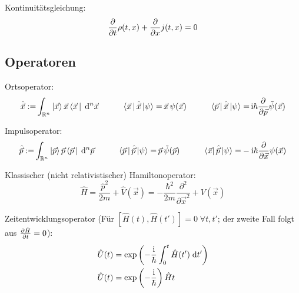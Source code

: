 \documentclass[11pt]{article}
\DeclareMathOperator*{\SumInt}{%
\mathchoice%
  {\ooalign{$\displaystyle\sum$\cr\hidewidth$\displaystyle\int$\hidewidth\cr}}
  {\ooalign{\raisebox{.14\height}{\scalebox{.7}{$\textstyle\sum$}}\cr\hidewidth$\textstyle\int$\hidewidth\cr}}
  {\ooalign{\raisebox{.2\height}{\scalebox{.6}{$\scriptstyle\sum$}}\cr$\scriptstyle\int$\cr}}
  {\ooalign{\raisebox{.2\height}{\scalebox{.6}{$\scriptstyle\sum$}}\cr$\scriptstyle\int$\cr}}
}
\numberwithin{equation}{section}
\begin{document}
				\noindent
				Kontinuitätsgleichung:
				\begin{equation}
					\frac{\partial }{\partial t}\rho(t,x) + \frac{\partial }{\partial x}j(t,x) = 0
				\end{equation}

		\subsection{Operatoren}
			\noindent
			Ortsoperator:
			\begin{equation}
				\begin{aligned}
					\hat{\vec{x}} :=& \int_{\mathbb{R}^n} \Ket{\vec{x}} \vec{x} \Bra{\vec{x}\,}\;\mathrm{d}^n\vec{x} &\hspace{20pt}
					\Bra{\vec{x}\,}\hat{\vec{x}}\Ket{\psi} =& \,\vec{x}\, \psi(\vec{x}) &\hspace{20pt}
					\Bra{\vec{p}\,}\hat{\vec{x}}\Ket{\psi} =& \,\mathrm{i}\hbar\frac{\partial }{\partial \vec{p}}\tilde{\psi}(\vec{x}) \\
				\end{aligned}
			\end{equation}

			\noindent
			Impulsoperator:
			\begin{equation}
				\begin{aligned}
					\hat{\vec{p}} :=& \int_{\mathbb{R}^n} \Ket{\vec{p}} \vec{p} \Bra{\vec{p}\,}\;\mathrm{d}^n\vec{p} &\hspace{20pt}
					\Bra{\vec{p}\,}\hat{\vec{p}}\Ket{\psi} =& \,\vec{p}\, \tilde{\psi}(\vec{p}) &\hspace{20pt}
					\Bra{\vec{x}}\hat{\vec{p}}\Ket{\psi} =& -\mathrm{i}\hbar\frac{\partial }{\partial \vec{x}} \psi(\vec{x}) \\
				\end{aligned}
			\end{equation}

			\noindent
			Klassischer (nicht relativistischer) Hamiltonoperator:
			\begin{equation}
				\hat{H} = \frac{\hat{p}^2}{2m}+\hat{V}(\vec{x}) = -\frac{\hbar^2}{2m}\frac{\partial^2}{\partial \vec{x}^2} + V(\vec{x})
			\end{equation}

			\noindent
			Zeitentwicklungsoperator (Für $\left[\hat{H}(t),\hat{H}(t')\right] = 0\;\forall t,t'$; der zweite Fall folgt aus $\frac{\partial \hat{H}}{\partial t}=0$):
			\begin{equation}
				\begin{aligned}
					\hat{U}(t) &= \exp{\left(-\frac{ \mathrm{i} }{\hbar}\int_0^t \hat{H}(t')\; \mathrm{d} t'\right)} \\
					\hat{U}(t) &= \exp{\left(-\frac{ \mathrm{i} }{\hbar}\right)\hat{H} t} \\
				\end{aligned}
			\end{equation}
\end{document}
